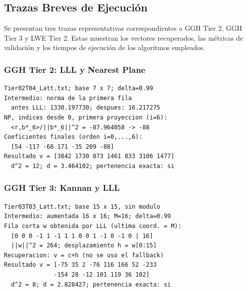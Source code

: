 \documentclass[12pt,a4paper]{article}
\begin{document}
\subsection{Trazas Breves de Ejecución}


Se presentan tres trazas representativas correspondientes
a GGH Tier 2, GGH Tier 3 y LWE Tier 2. Estas muestran
los vectores recuperados, las métricas de validación y
los tiempos de ejecución de los algoritmos empleados.

\par\medskip
\noindent\begin{minipage}{\textwidth}
\subsubsection*{GGH Tier 2: LLL y Nearest Plane}
\begin{verbatim}
Tier02T04_Latt.txt; base 7 x 7; delta=0.99
Intermedio: norma de la primera fila
  antes LLL: 1330.197730; despues: 16.217275
NP, indices desde 0, primera proyeccion (i=6):
  <r,b*_6>/||b*_6||^2 = -87.964058 -> -88
Coeficientes finales (orden i=0,...,6):
  [54 -117 -68 171 -35 209 -88]
Resultado v = [3842 1730 873 1461 833 3106 1477]
  d^2 = 12; d = 3.464102; pertenencia exacta: si
\end{verbatim}
\end{minipage}\par\medskip

\par\medskip
\noindent\begin{minipage}{\textwidth}
\subsubsection*{GGH Tier 3: Kannan y LLL}
\begin{verbatim}
Tier03T03_Latt.txt; base 15 x 15, sin modulo
Intermedio: aumentada 16 x 16; M=16; delta=0.99
Fila corta w obtenida por LLL (ultima coord. = M):
  [0 0 0 -1 1 -1 1 1 0 0 1 -1 0 -1 0 | 16]
  ||w||^2 = 264; desplazamiento h = w[0:15]
Recuperacion: v = c+h (no se uso el fallback)
Resultado v = [-75 35 2 -76 116 166 52 -233
              -154 28 -12 101 119 36 102]
  d^2 = 8; d = 2.828427; pertenencia exacta: si
\end{verbatim}
\end{minipage}\par\medskip
\end{document}
